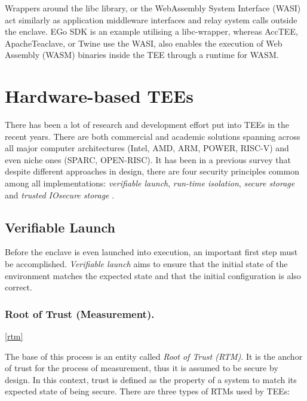 \documentclass[runningheads,a4paper]{uwsese}
\begin{document}
Wrappers around the libc library, or the WebAssembly System Interface (WASI)
act similarly as application middleware interfaces and relay system calls
outside the enclave. EGo SDK is an example utilising a libc-wrapper, whereas
AccTEE, ApacheTeaclave, or Twine use the WASI, also enables the execution of
Web Assembly (WASM) binaries inside the TEE through a runtime for WASM.

\section{Hardware-based TEEs}

There has been a lot of research and development effort put into TEEs in the
recent years. There are both commercial and academic solutions spanning across
all major computer architectures (Intel, AMD, ARM, POWER, RISC-V) and even
niche ones (SPARC, OPEN-RISC). It has been in a previous survey that despite
different approaches in design, there are four security principles common among
all implementations: \emph{verifiable launch}, \emph{run-time isolation},
\emph{secure storage} and \emph{trusted IO}\emph{secure storage}
\cite{tee_hw_sup}.

\subsection{Verifiable Launch}

Before the enclave is even launched into execution, an important first step must
be accomplished. \emph{Verifiable launch} aims to ensure that the initial state 
of the environment matches the expected state and that the initial configuration is
also correct. 

\subsubsection{Root of Trust (Measurement).}
\ref{rtm}

The base of this process is an entity called \emph{Root of Trust (RTM)}. It is
the anchor of trust for the process of measurement, thus it is assumed to be
secure by design. In this context, trust is defined as the property of a system
to match its expected state of being secure. There are three types of RTMs used by TEEs:
\end{document}
